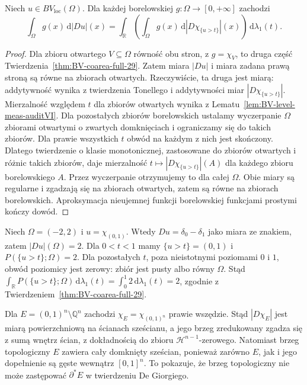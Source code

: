 \begin{wniosek}
\label{cor:BV-coarea-weighted-29}
Niech $u\in BV_{\mathrm{loc}}(\Omega)$.
Dla każdej borelowskiej $g:\Omega\to[0,+\infty]$
zachodzi
\[
 \int_\Omega g(x)\,\mathrm d|Du|(x)
 =\int_{\mathbb R}\left(\int_\Omega g(x)
 \,\mathrm d|D\chi_{\{u>t\}}|(x)\right)
 \,\mathrm d\lambda_1(t).
\]
\end{wniosek}
\begin{proof}
Dla zbioru otwartego $V\subseteq\Omega$
równość obu stron, z $g=\chi_V$, to druga
część Twierdzenia~\ref{thm:BV-coarea-full-29}.
Zatem miara $|Du|$ i miara zadana prawą
stroną są równe na zbiorach otwartych.
Rzeczywiście, ta druga jest miarą: addytywność
wynika z twierdzenia Tonellego i addytywności
miar $|D\chi_{\{u>t\}}|$. Mierzalność względem
$t$ dla zbiorów otwartych wynika z
Lematu~\ref{lem:BV-level-meas-auditVI}.
Dla pozostałych zbiorów borelowskich ustalamy
wyczerpanie $\Omega$ zbiorami otwartymi o zwartych
domknięciach i ograniczamy się do takich zbiorów.
Dla prawie wszystkich $t$ obwód na każdym z nich
jest skończony. Dlatego twierdzenie o klasie
monotonicznej, zastosowane do zbiorów otwartych
i różnic takich zbiorów, daje mierzalność
$t\mapsto|D\chi_{\{u>t\}}|(A)$ dla każdego
zbioru borelowskiego $A$. Przez wyczerpanie
otrzymujemy to dla całej $\Omega$.
Obie miary są regularne i zgadzają się na
zbiorach otwartych, zatem są równe na
zbiorach borelowskich. Aproksymacja
nieujemnej funkcji borelowskiej funkcjami
prostymi kończy dowód.
\end{proof}

\begin{przyklad}
Niech $\Omega=(-2,2)$ i $u=\chi_{(0,1)}$.
Wtedy $Du=\delta_0-\delta_1$ jako miara
ze znakiem, zatem $|Du|(\Omega)=2$.
Dla $0<t<1$ mamy $\{u>t\}=(0,1)$ i
$P(\{u>t\};\Omega)=2$. Dla pozostałych
$t$, poza nieistotnymi poziomami $0$ i $1$,
obwód poziomicy jest zerowy: zbiór jest
pusty albo równy $\Omega$. Stąd
$\int_{\mathbb R}P(\{u>t\};\Omega)
\,\mathrm d\lambda_1(t)=\int_0^1 2\,
\mathrm d\lambda_1(t)=2$, zgodnie z
Twierdzeniem~\ref{thm:BV-coarea-full-29}.
\end{przyklad}

\begin{przyklad}
Dla $E=(0,1)^n\setminus\mathbb Q^n$
zachodzi $\chi_E=\chi_{(0,1)^n}$ prawie wszędzie.
Stąd $|D\chi_E|$ jest miarą powierzchniową
na ścianach sześcianu, a jego brzeg zredukowany
zgadza się z sumą wnętrz ścian, z dokładnością
do zbioru $\mathcal H^{n-1}$-zerowego.
Natomiast brzeg topologiczny $E$ zawiera
cały domknięty sześcian, ponieważ zarówno
$E$, jak i jego dopełnienie są gęste
wewnątrz $[0,1]^n$. To pokazuje, że
brzeg topologiczny nie może zastępować
$\partial^*E$ w twierdzeniu De Giorgiego.
\end{przyklad}

